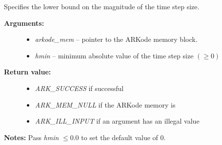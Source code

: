 \documentclass[letterpaper,10pt,english]{sphinxmanual}
\begin{document}
\begin{fulllineitems}
\label{c_interface/User_callable:c.ARKodeSetMinStep}
Specifies the lower bound on the magnitude of the time step size.
\begin{description}
\item[{\textbf{Arguments:}}] \leavevmode\begin{itemize}
\item {} 
\emph{arkode\_mem} -- pointer to the ARKode memory block.

\item {} 
\emph{hmin} -- minimum absolute value of the time step size \((\ge 0)\)

\end{itemize}

\item[{\textbf{Return value:}}] \leavevmode\begin{itemize}
\item {} 
\emph{ARK\_SUCCESS} if successful

\item {} 
\emph{ARK\_MEM\_NULL} if the ARKode memory is 

\item {} 
\emph{ARK\_ILL\_INPUT} if an argument has an illegal value

\end{itemize}

\end{description}

\textbf{Notes:} Pass \emph{hmin} \(\le 0.0\) to set the default value of 0.

\end{fulllineitems}

\end{document}
